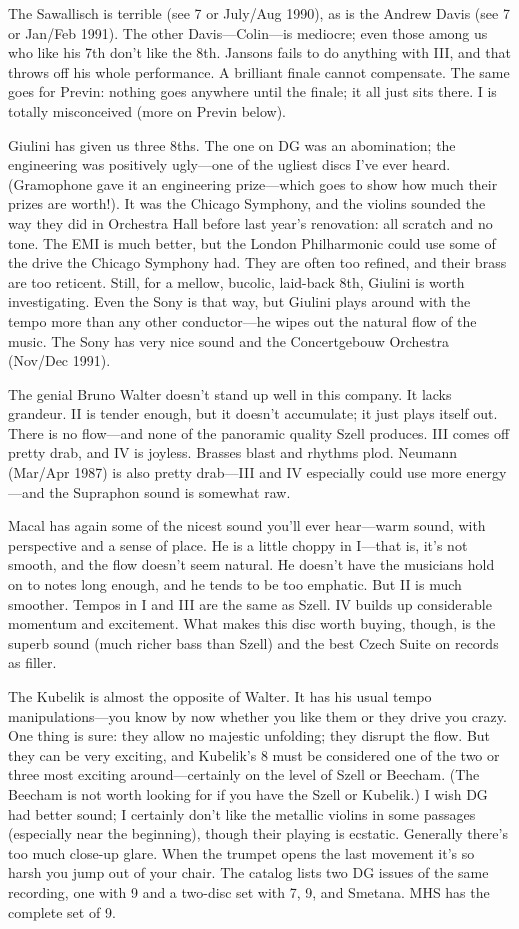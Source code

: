 \documentclass[12pt]{article}%
\begin{document}
The Sawallisch is terrible (see 7 or July/Aug
1990), as is the Andrew Davis (see 7 or Jan/Feb
1991). The other Davis---Colin---is mediocre; even those among us who like his 7th don't like the 8th. Jansons fails to do anything with III, and that throws off his whole performance.
A brilliant finale cannot compensate. The same goes for Previn: nothing goes anywhere until the finale; it all just sits there. I is totally misconceived (more on Previn below).

Giulini has given us three 8ths. The one on DG was an abomination; the engineering was positively ugly---one of the ugliest discs I've ever heard. (Gramophone gave it an engineering prize---which goes to show how much their
prizes are worth!). 
It was the Chicago Symphony, and the violins sounded the way they did in Orchestra Hall before last year's renovation: all scratch and no tone. The EMI is much better,
but the London Philharmonic could use some of the drive the Chicago Symphony had. They are often too refined, and their brass are too reticent. Still, for a mellow, bucolic, laid-back 8th, Giulini is worth investigating. Even the Sony is that way, but Giulini plays around with the tempo more than any other conductor---he wipes out the natural flow of the music. The Sony has very nice sound and the Concertgebouw Orchestra (Nov/Dec 1991).

The genial Bruno Walter doesn't stand up well in this company. It lacks grandeur. II is tender enough, but it doesn't accumulate; it just plays itself out. There is no flow---and none of the panoramic quality Szell produces.
III comes off pretty drab, and IV is joyless.
Brasses blast and rhythms plod. Neumann (Mar/Apr 1987) is also pretty drab---III and IV especially could use more energy---and the Supraphon sound is somewhat raw.

Macal has again some of the nicest sound you'll ever hear---warm sound, with perspective and a sense of place. He is a little choppy in I---that is, it's not smooth, and the flow doesn't seem natural. He doesn't have the musicians hold on to notes long enough, and he tends to be too emphatic. But II is much
smoother. Tempos in I and III are the same as Szell. IV builds up considerable momentum and excitement. What makes this disc worth buying, though, is the superb sound (much richer bass than Szell) and the best Czech Suite on records as filler.

The Kubelik is almost the opposite of Walter. It has his usual tempo manipulations---you know by now whether you like them or they drive you crazy. One thing is sure: they allow no majestic unfolding; they disrupt the flow. But they can be very exciting, and Kubelik's 8 must be considered one of the two or three most exciting around---certainly on the level of Szell or Beecham. (The Beecham is not worth looking for if you have the Szell or Kubelik.) I wish DG had better sound; I certainly don't like the metallic violins in some passages (especially near the beginning), though their playing is ecstatic. Generally there's too much close-up glare. When the trumpet opens the last movement it's so harsh you jump out of your chair. The catalog lists two DG issues of the same recording, one with 9 and a two-disc set with 7, 9, and Smetana.
MHS has the complete set of 9.
\end{document}
